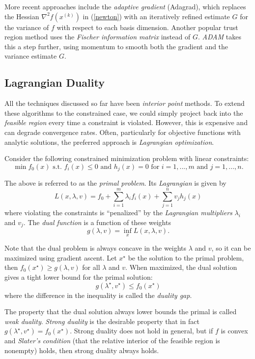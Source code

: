 \documentclass[12pt]{article}
\begin{document}
More recent approaches include the {\it adaptive gradient} (Adagrad),
which replaces the Hessian $\nabla^2 f(x^{(k)})$ in (\ref{newton}) with an 
iteratively refined estimate $G$ for the variance of $f$ with respect to
each basis dimension.
Another popular trust region method uses the {\it Fischer information matrix} 
instead of $G$.
{\it ADAM} takes this a step further, using momentum to smooth
both the gradient and the variance estimate $G$.

\subsection*{Lagrangian Duality}

All the techniques discussed so far have been {\it interior point}
methods.
To extend these algorithms to the constrained case, we could
simply project back into the {\it feasible region} every time
a constraint is violated.
However, this is expensive and can degrade convergence rates.
Often, particularly for objective functions with analytic solutions, the 
preferred approach is {\it Lagrangian optimization}.

Consider the following constrained minimization problem with linear
constraints:
\begin{equation}
\label{lagrange}
\min f_0(x) \text{ s.t. } f_i(x) \leq 0 \text{ and } h_j(x) = 0 
\text{ for } i = 1,...,m \text{ and } j = 1,...,n.
\end{equation}

The above is referred to as the {\it primal problem}.
Its {\it Lagrangian} is given by
$$
L(x,\lambda,v) 
= f_0 + \sum_{i=1}^m\lambda_i f_i(x) + \sum_{j=1}^n v_j h_j(x)
$$
where violating the constraints is ``penalized'' by the 
{\it Lagrangian multipliers} $\lambda_i$ and $v_j$.
The {\it dual function} is a function of these weights
$$
g(\lambda, v) = \inf_x L(x,\lambda,v).
$$

Note that the dual problem is always concave in the weights $\lambda$ and 
$v$, so it can be maximized using gradient ascent.
Let $x^\star$ be the solution to the primal problem, then 
$f_0(x^\star) \geq g(\lambda, v)$ for all $\lambda$ and $v$.
When maximized, the dual solution gives a tight lower bound for the 
primal solution:
$$
g(\lambda^\star, v^\star) \leq f_0(x^\star)
$$
where the difference in the inequality is called the 
{\it duality gap}.

The property that the dual solution always lower bounds the primal
is called {\it weak duality}.
{\it Strong duality} is the desirable property that in fact 
$g(\lambda^\star, v^\star) = f_0(x^\star)$.
Strong duality does not hold in general, but if $f$ is
convex and {\it Slater's condition} (that the relative
interior of the feasible region is nonempty) holds,
then strong duality always holds.
\end{document}
